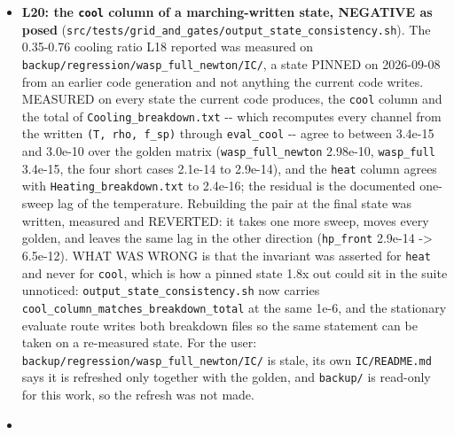 \documentclass[english,a4paper]{my_memo}
\begin{document}
\begin{itemize}
  the same \texttt{(u,\ f\_sp)} every row is measured on and prints it with its worst
  cell, its natural scale being nine decades below every tolerance in the
  inventory. MEASURED on the state a run writes: 4.151e-14 -\textgreater{} 4.196e-16
  (\texttt{hp\_front}, 100 steps) and 1.537e-14 -\textgreater{} 3.623e-16 (\texttt{hydrostatic\_column},
  300 steps), the drift replaced by the rounding of the projection. Codex
  review applied: the projection is bounded and reports itself -\/- silent below
  1e-12, reported to 1e-8, and above that NOT applied and the sweep reported as
  having failed its closure -\/- with finite and positive guards and the absolute
  element-total movement named.
\item
  \textbf{L20: the \texttt{cool} column of a marching-written state, NEGATIVE as posed}
  (\texttt{src/tests/grid\_and\_gates/output\_state\_consistency.sh}). The 0.35-0.76
  cooling ratio L18 reported was measured on
  \texttt{backup/regression/wasp\_full\_newton/IC/}, a state PINNED on 2026-09-08 from
  an earlier code generation and not anything the current code writes.
  MEASURED on every state the current code produces, the \texttt{cool} column and the
  total of \texttt{Cooling\_breakdown.txt} -\/- which recomputes every channel from the
  written \texttt{(T,\ rho,\ f\_sp)} through \texttt{eval\_cool} -\/- agree to between 3.4e-15 and
  3.0e-10 over the golden matrix (\texttt{wasp\_full\_newton} 2.98e-10, \texttt{wasp\_full}
  3.4e-15, the four short cases 2.1e-14 to 2.9e-14), and the \texttt{heat} column
  agrees with \texttt{Heating\_breakdown.txt} to 2.4e-16; the residual is the
  documented one-sweep lag of the temperature. Rebuilding the pair at the final
  state was written, measured and REVERTED: it takes one more sweep, moves
  every golden, and leaves the same lag in the other direction (\texttt{hp\_front}
  2.9e-14 -\textgreater{} 6.5e-12). WHAT WAS WRONG is that the invariant was asserted for
  \texttt{heat} and never for \texttt{cool}, which is how a pinned state 1.8x out could sit
  in the suite unnoticed: \texttt{output\_state\_consistency.sh} now carries
  \texttt{cool\_column\_matches\_breakdown\_total} at the same 1e-6, and the stationary
  evaluate route writes both breakdown files so the same statement can be taken
  on a re-measured state. For the user: \texttt{backup/regression/wasp\_full\_newton/IC/}
  is stale, its own \texttt{IC/README.md} says it is refreshed only together with the
  golden, and \texttt{backup/} is read-only for this work, so the refresh was not made.
\item

\end{itemize}
\end{document}
